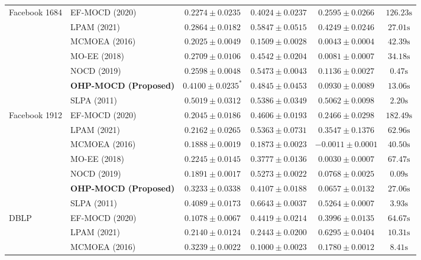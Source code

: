 \documentclass{llncs}
\begin{document}
\begin{table}[t]
{\begin{tabular}{@{}llcccc@{}}
\midrule
Facebook 1684 & EF-MOCD (2020) & $0.2274 \pm 0.0235$ & $0.4024 \pm 0.0237$ & $0.2595 \pm 0.0266$ & $126.23\text{s}$ \\
 & LPAM (2021) & $0.2864 \pm 0.0182$ & $\mathbf{0.5847 \pm 0.0515}$ & $0.4249 \pm 0.0246$ & $27.01\text{s}$ \\
 & MCMOEA (2016) & $0.2025 \pm 0.0049$ & $0.1509 \pm 0.0028$ & $0.0043 \pm 0.0004$ & $42.39\text{s}$ \\
 & MO-EE (2018) & $0.2709 \pm 0.0106$ & $0.4542 \pm 0.0204$ & $0.0081 \pm 0.0007$ & $34.18\text{s}$ \\
 & NOCD (2019) & $0.2598 \pm 0.0048$ & $0.5473 \pm 0.0043$ & $0.1136 \pm 0.0027$ & $0.47\text{s}$ \\
 & \textbf{OHP-MOCD (Proposed)} & $0.4100 \pm 0.0235^*$ & $0.4845 \pm 0.0453$ & $0.0930 \pm 0.0089$ & $13.06\text{s}$ \\
 & SLPA (2011) & $\mathbf{0.5019 \pm 0.0312}$ & $0.5386 \pm 0.0349$ & $\mathbf{0.5062 \pm 0.0098}$ & $2.20\text{s}$ \\
\midrule
Facebook 1912 & EF-MOCD (2020) & $0.2045 \pm 0.0186$ & $0.4606 \pm 0.0193$ & $0.2466 \pm 0.0298$ & $182.49\text{s}$ \\
 & LPAM (2021) & $0.2162 \pm 0.0265$ & $0.5363 \pm 0.0731$ & $0.3547 \pm 0.1376$ & $62.96\text{s}$ \\
 & MCMOEA (2016) & $0.1888 \pm 0.0019$ & $0.1873 \pm 0.0023$ & $-0.0011 \pm 0.0001$ & $40.50\text{s}$ \\
 & MO-EE (2018) & $0.2245 \pm 0.0145$ & $0.3777 \pm 0.0136$ & $0.0030 \pm 0.0007$ & $67.47\text{s}$ \\
 & NOCD (2019) & $0.1891 \pm 0.0017$ & $0.5273 \pm 0.0022$ & $0.0768 \pm 0.0025$ & $0.09\text{s}$ \\
 & \textbf{OHP-MOCD (Proposed)} & $0.3233 \pm 0.0338$ & $0.4107 \pm 0.0188$ & $0.0657 \pm 0.0132$ & $27.06\text{s}$ \\
 & SLPA (2011) & $\mathbf{0.4089 \pm 0.0173}$ & $\mathbf{0.6643 \pm 0.0037}$ & $\mathbf{0.5264 \pm 0.0007}$ & $3.93\text{s}$ \\
\midrule
DBLP & EF-MOCD (2020) & $0.1078 \pm 0.0067$ & $\mathbf{0.4419 \pm 0.0214}$ & $0.3996 \pm 0.0135$ & $64.67\text{s}$ \\
 & LPAM (2021) & $0.2140 \pm 0.0124$ & $0.2443 \pm 0.0200$ & $0.6295 \pm 0.0404$ & $10.31\text{s}$ \\
 & MCMOEA (2016) & $0.3239 \pm 0.0022$ & $0.1000 \pm 0.0023$ & $0.1780 \pm 0.0012$ & $8.41\text{s}$ \\

\end{tabular}}
\end{table}
\end{document}
